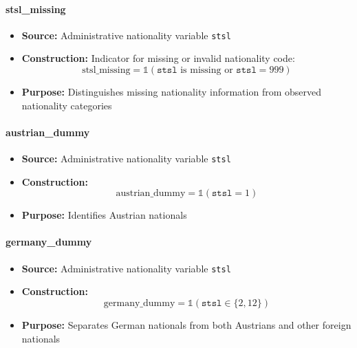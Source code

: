 \documentclass{article}
\begin{document}
\paragraph{stsl\_missing}
\begin{itemize}
    \item \textbf{Source:} Administrative nationality variable \texttt{stsl}
    \item \textbf{Construction:} Indicator for missing or invalid nationality code:
    \begin{equation}
        \text{stsl\_missing} = \mathbb{1}(\texttt{stsl} \text{ is missing or } \texttt{stsl}=999)
    \end{equation}
    \item \textbf{Purpose:} Distinguishes missing nationality information from observed nationality categories
\end{itemize}

\paragraph{austrian\_dummy}
\begin{itemize}
    \item \textbf{Source:} Administrative nationality variable \texttt{stsl}
    \item \textbf{Construction:}
    \begin{equation}
        \text{austrian\_dummy} = \mathbb{1}(\texttt{stsl}=1)
    \end{equation}
    \item \textbf{Purpose:} Identifies Austrian nationals
\end{itemize}

\paragraph{germany\_dummy}
\begin{itemize}
    \item \textbf{Source:} Administrative nationality variable \texttt{stsl}
    \item \textbf{Construction:}
    \begin{equation}
        \text{germany\_dummy} = \mathbb{1}(\texttt{stsl} \in \{2,12\})
    \end{equation}
    \item \textbf{Purpose:} Separates German nationals from both Austrians and other foreign nationals
\end{itemize}
\end{document}
